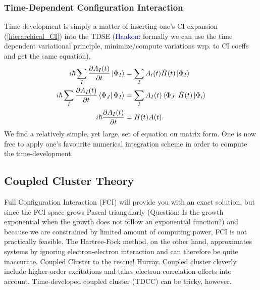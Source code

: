 \documentclass[aip,jcp,reprint,floatfix]{revtex4-1}
\begin{document}
\subsubsection{Time-Dependent Configuration Interaction}
Time-development is simply a matter of inserting one's CI expansion (\autoref{hierarchical_CI}) into the TDSE (\textcolor{blue}{Haakon:} formally we can use the time dependent variational principle, minimize/compute variations wrp. to CI coeffs and get the same equation),
\begin{align}
    i\hbar \sum_I \frac{\partial A_I(t)}{\partial t} \ket{\Phi_I} &= \sum_I A_i(t) \hat{H}(t) \ket{\Phi_I} \\
    i \hbar \sum_I \frac{\partial A_I(t)}{\partial t} \bra{\Phi_J}\Phi_I\rangle &= \sum_I A_I(t) \bra{\Phi_J} \hat{H}(t) \ket{\Phi_i} \\
    i\hbar \frac{\partial A_I(t)}{\partial t} &= H(t)A(t).
\end{align}
We find a relatively simple, yet large, set of equation on matrix form. One is now free to apply one's favourite numerical integration scheme in order to compute the time-development.

\subsection{Coupled Cluster Theory}
    
    Full Configuration Interaction (FCI) will provide you with an exact solution, but since the FCI space grows Pascal-triangularly (Question: Is the growth exponential when the growth does not follow an exponential function?) and because we are constrained by limited amount of computing power, FCI is not practically feasible. The Hartree-Fock method, on the other hand, approximates systems by ignoring electron-electron interaction and can therefore be quite inaccurate. Coupled Cluster to the rescue! Hurray. Coupled cluster cleverly include higher-order excitations and takes electron correlation effects into account. Time-developed coupled cluster (TDCC) can be tricky, however. 
    
\end{document}
